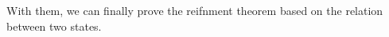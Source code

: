 With them, 
we can finally prove the reifnment theorem based on the relation between 
two states.  

%
%
%

